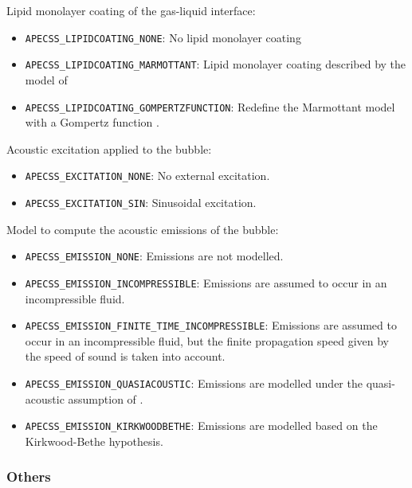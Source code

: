 Lipid monolayer coating of the gas-liquid interface:\vspace{-1em}
\begin{itemize}[noitemsep]
  \item {\tt APECSS\_LIPIDCOATING\_NONE}: No lipid monolayer coating
  \item {\tt APECSS\_LIPIDCOATING\_MARMOTTANT}: Lipid monolayer coating described by the model of \citet{Marmottant2005}
  \item {\tt APECSS\_LIPIDCOATING\_GOMPERTZFUNCTION}: Redefine the Marmottant model with a Gompertz function \citep{Guemmer2021}.
\end{itemize}

Acoustic excitation applied to the bubble:\vspace{-1em}
\begin{itemize}[noitemsep]
  \item {\tt APECSS\_EXCITATION\_NONE}: No external excitation. 
  \item {\tt APECSS\_EXCITATION\_SIN}: Sinusoidal excitation.
\end{itemize}

Model to compute the acoustic emissions of the bubble:\vspace{-1em}
\begin{itemize}[noitemsep]
  \item {\tt APECSS\_EMISSION\_NONE}: Emissions are not modelled.
  \item {\tt APECSS\_EMISSION\_INCOMPRESSIBLE}: Emissions are assumed to occur in an incompressible fluid.
  \item {\tt APECSS\_EMISSION\_FINITE\_TIME\_INCOMPRESSIBLE}: Emissions are assumed to occur in an incompressible fluid, but the finite propagation speed given by the speed of sound is taken into account.
  \item {\tt APECSS\_EMISSION\_QUASIACOUSTIC}: Emissions are modelled under the quasi-acoustic assumption of \citet{Gilmore1952}.
  \item {\tt APECSS\_EMISSION\_KIRKWOODBETHE}: Emissions are modelled based on the Kirkwood-Bethe hypothesis.
\end{itemize}


\subsubsection{Others}

